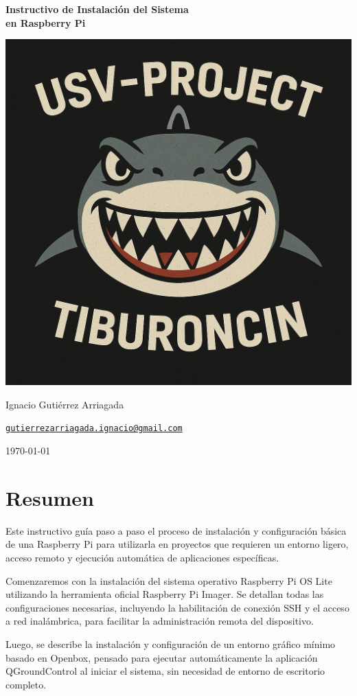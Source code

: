 \documentclass[12pt]{article}
\begin{document}
\begin{titlepage}
    \centering
    \vspace*{2cm}

    {\Huge \textbf{Instructivo de Instalación del Sistema\\[0.5em] en Raspberry Pi} \par}
    \vspace{2cm}

    \includegraphics[width=0.4\linewidth]{tiburoncin.jpg}
    \vspace{2cm}

    {\Large Ignacio Gutiérrez Arriagada \par}
    \vspace{0.5em}
    {\large \texttt{\href{mailto:gutierrezarriagada.ignacio@gmail.com}{gutierrezarriagada.ignacio@gmail.com}} \par}

    \vfill

    {\large \today\par}
\end{titlepage}


\section*{Resumen}

Este instructivo guía paso a paso el proceso de instalación y configuración básica de una Raspberry Pi para utilizarla en proyectos que requieren un entorno ligero, acceso remoto y ejecución automática de aplicaciones específicas. 

Comenzaremos con la instalación del sistema operativo Raspberry Pi OS Lite utilizando la herramienta oficial Raspberry Pi Imager. Se detallan todas las configuraciones necesarias, incluyendo la habilitación de conexión SSH y el acceso a red inalámbrica, para facilitar la administración remota del dispositivo.

Luego, se describe la instalación y configuración de un entorno gráfico mínimo basado en Openbox, pensado para ejecutar automáticamente la aplicación QGroundControl al iniciar el sistema, sin necesidad de entorno de escritorio completo.
\end{document}
